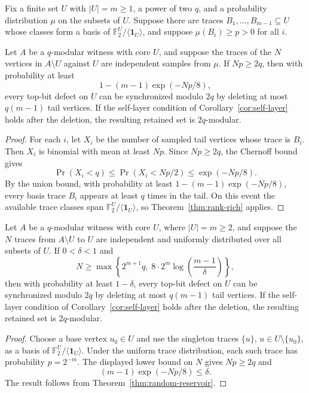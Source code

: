 \documentclass[thmsec,dntnbr,nolinenbrs]{dmgt}
\numberwithin{equation}{section}
\newcommand{\F}{\mathbb{F}}
\newcommand{\one}{\mathbf{1}}
\begin{document}
\begin{theorem}\label{thm:random-reservoir}
Fix a finite set \(U\) with \(|U|=m\ge 1\), a power of two \(q\), and a probability distribution \(\mu\) on the subsets of \(U\).  Suppose there are traces \(B_1,\ldots,B_{m-1}\subseteq U\) whose classes form a basis of \(\F_2^U/\langle \one_U\rangle\), and suppose \(\mu(B_i)\ge p>0\) for all \(i\).

Let \(A\) be a \(q\)-modular witness with core \(U\), and suppose the traces of the \(N\) vertices in \(A\setminus U\) against \(U\) are independent samples from \(\mu\).  If \(Np\ge 2q\), then with probability at least
\[
        1-(m-1)\exp(-Np/8),
\]
every top-bit defect on \(U\) can be synchronized modulo \(2q\) by deleting at most \(q(m-1)\) tail vertices.  If the self-layer condition of Corollary~\ref{cor:self-layer} holds after the deletion, the resulting retained set is \(2q\)-modular.
\end{theorem}

\begin{proof}
For each \(i\), let \(X_i\) be the number of sampled tail vertices whose trace is \(B_i\).  Then \(X_i\) is binomial with mean at least \(Np\).  Since \(Np\ge 2q\), the Chernoff bound gives
\[
        \Pr(X_i<q)\le \Pr(X_i<Np/2)\le \exp(-Np/8).
\]
By the union bound, with probability at least \(1-(m-1)\exp(-Np/8)\), every basis trace \(B_i\) appears at least \(q\) times in the tail.  On this event the available trace classes span \(\F_2^U/\langle \one_U\rangle\), so Theorem~\ref{thm:rank-rich} applies.
\end{proof}

\begin{corollary}\label{cor:uniform-random}
Let \(A\) be a \(q\)-modular witness with core \(U\), where \(|U|=m\ge 2\), and suppose the \(N\) traces from \(A\setminus U\) to \(U\) are independent and uniformly distributed over all subsets of \(U\).  If \(0<\delta<1\) and
\[
        N\ge \max\left\{2^{m+1}q,\;8\cdot 2^m\log\left(\frac{m-1}{\delta}\right)\right\},
\]
then with probability at least \(1-\delta\), every top-bit defect on \(U\) can be synchronized modulo \(2q\) by deleting at most \(q(m-1)\) tail vertices.  If the self-layer condition of Corollary~\ref{cor:self-layer} holds after the deletion, the resulting retained set is \(2q\)-modular.
\end{corollary}

\begin{proof}
Choose a base vertex \(u_0\in U\) and use the singleton traces \(\{u\}\), \(u\in U\setminus\{u_0\}\), as a basis of \(\F_2^U/\langle\one_U\rangle\).  Under the uniform trace distribution, each such trace has probability \(p=2^{-m}\).  The displayed lower bound on \(N\) gives \(Np\ge 2q\) and
\[
        (m-1)\exp(-Np/8)\le \delta.
\]
The result follows from Theorem~\ref{thm:random-reservoir}.
\end{proof}
\end{document}
